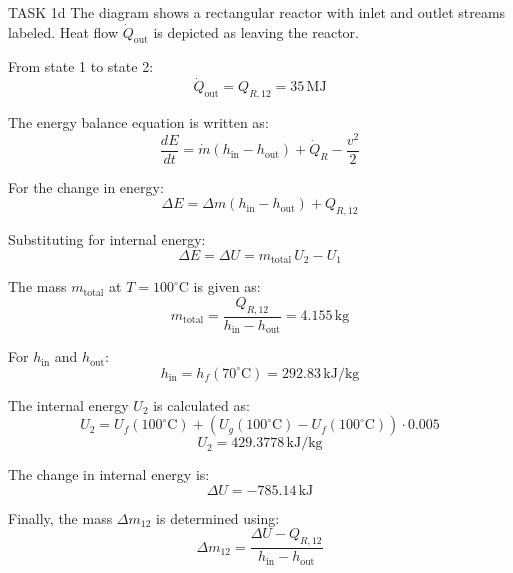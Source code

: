 TASK 1d  
The diagram shows a rectangular reactor with inlet and outlet streams labeled. Heat flow \( \dot{Q}_{\text{out}} \) is depicted as leaving the reactor.

From state 1 to state 2:
\[
\dot{Q}_{\text{out}} = Q_{R,12} = 35 \, \text{MJ}
\]

The energy balance equation is written as:
\[
\frac{dE}{dt} = \dot{m} \left( h_{\text{in}} - h_{\text{out}} \right) + \dot{Q}_R - \frac{v^2}{2}
\]

For the change in energy:
\[
\Delta E = \Delta m \left( h_{\text{in}} - h_{\text{out}} \right) + Q_{R,12}
\]

Substituting for internal energy:
\[
\Delta E = \Delta U = m_{\text{total}} \, U_2 - U_1
\]

The mass \( m_{\text{total}} \) at \( T = 100^\circ\text{C} \) is given as:
\[
m_{\text{total}} = \frac{Q_{R,12}}{h_{\text{in}} - h_{\text{out}}} = 4.155 \, \text{kg}
\]

For \( h_{\text{in}} \) and \( h_{\text{out}} \):
\[
h_{\text{in}} = h_f(70^\circ\text{C}) = 292.83 \, \text{kJ/kg}
\]

The internal energy \( U_2 \) is calculated as:
\[
U_2 = U_f(100^\circ\text{C}) + \left( U_g(100^\circ\text{C}) - U_f(100^\circ\text{C}) \right) \cdot 0.005
\]
\[
U_2 = 429.3778 \, \text{kJ/kg}
\]

The change in internal energy is:
\[
\Delta U = -785.14 \, \text{kJ}
\]

Finally, the mass \( \Delta m_{12} \) is determined using:
\[
\Delta m_{12} = \frac{\Delta U - Q_{R,12}}{h_{\text{in}} - h_{\text{out}}}
\]